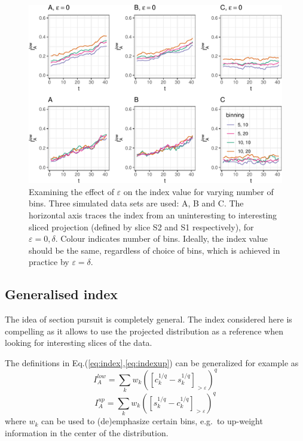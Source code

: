 \documentclass[]{interact}
\theoremstyle{plain}%
\theoremstyle{definition}
\theoremstyle{remark}
\begin{document}
\begin{figure}

{\centering \includegraphics[width=0.9\linewidth]{section_pursuit_files/figure-latex/path_eps-1} 

}

\caption{Examining the effect of $\varepsilon$ on the index value for varying number of bins. Three simulated data sets are used:  A, B and C. The horizontal axis traces the index from an uninteresting to interesting sliced projection (defined by slice S2 and S1 respectively), for $\varepsilon=0, \delta$. Colour indicates number of bins. Ideally, the index value should be the same, regardless of choice of bins, which is achieved in practice by $\varepsilon=\delta$.}\label{fig:path_eps}
\end{figure}

\hypertarget{generalised-index}{%
\subsection{\texorpdfstring{Generalised index
\label{sec:generalise}}{Generalised index }}\label{generalised-index}}

The idea of section pursuit is completely general. The index considered
here is compelling as it allows to use the projected distribution as a
reference when looking for interesting slices of the data.

The definitions in Eq.(\ref{eq:index},\ref{eq:indexup}) can be
generalized for example as \begin{equation}
I_A^{low} = \sum_{k}w_{k}\left(\left[c_{k}^{1/q}-s_{k}^{1/q}\right]_{>\varepsilon}\right)^{q}
\label{eq:index2}
\end{equation} \begin{equation}
I_A^{up} = \sum_{k}w_{k}\left(\left[s_{k}^{1/q}-c_{k}^{1/q}\right]_{>\varepsilon}\right)^{q}
\label{eq:index2up}
\end{equation} where \(w_k\) can be used to (de)emphasize certain bins,
e.g.~to up-weight information in the center of the distribution.
\end{document}
